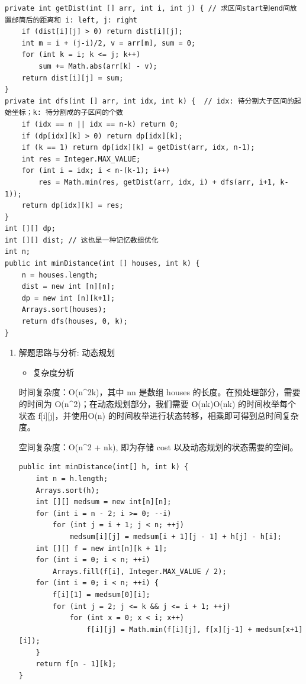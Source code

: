 \documentclass[9pt, b5paaper]{book}
\begin{document}
\begin{verbatim}
private int getDist(int [] arr, int i, int j) { // 求区间start到end间放置邮筒后的距离和 i: left, j: right
    if (dist[i][j] > 0) return dist[i][j];
    int m = i + (j-i)/2, v = arr[m], sum = 0;
    for (int k = i; k <= j; k++) 
        sum += Math.abs(arr[k] - v);
    return dist[i][j] = sum;
}
private int dfs(int [] arr, int idx, int k) {  // idx: 待分割大子区间的起始坐标；k: 待分割成的子区间的个数 
    if (idx == n || idx == n-k) return 0;
    if (dp[idx][k] > 0) return dp[idx][k];
    if (k == 1) return dp[idx][k] = getDist(arr, idx, n-1);
    int res = Integer.MAX_VALUE;
    for (int i = idx; i < n-(k-1); i++) 
        res = Math.min(res, getDist(arr, idx, i) + dfs(arr, i+1, k-1));
    return dp[idx][k] = res;
}
int [][] dp;
int [][] dist; // 这也是一种记忆数组优化
int n;
public int minDistance(int [] houses, int k) {
    n = houses.length;
    dist = new int [n][n];
    dp = new int [n][k+1];
    Arrays.sort(houses);
    return dfs(houses, 0, k);
}
\end{verbatim}
\begin{enumerate}
\item 解题思路与分析: 动态规划
\label{sec-1-4-39-1}
\begin{itemize}
\item 复杂度分析
\end{itemize}

时间复杂度：O(n\^{}2k)，其中 nn 是数组 houses 的长度。在预处理部分，需要的时间为 O(n\^{}2)；在动态规划部分，我们需要 O(nk)O(nk) 的时间枚举每个状态 f[i][j]，并使用O(n) 的时间枚举进行状态转移，相乘即可得到总时间复杂度。

空间复杂度：O(n\^{}2 + nk), 即为存储 cost 以及动态规划的状态需要的空间。

\begin{verbatim}
public int minDistance(int[] h, int k) {
    int n = h.length;
    Arrays.sort(h);
    int [][] medsum = new int[n][n];
    for (int i = n - 2; i >= 0; --i) 
        for (int j = i + 1; j < n; ++j) 
            medsum[i][j] = medsum[i + 1][j - 1] + h[j] - h[i];
    int [][] f = new int[n][k + 1];
    for (int i = 0; i < n; ++i) 
        Arrays.fill(f[i], Integer.MAX_VALUE / 2);
    for (int i = 0; i < n; ++i) {
        f[i][1] = medsum[0][i];
        for (int j = 2; j <= k && j <= i + 1; ++j)
            for (int x = 0; x < i; x++) 
                f[i][j] = Math.min(f[i][j], f[x][j-1] + medsum[x+1][i]);
    }
    return f[n - 1][k];
}
\end{verbatim}
\end{enumerate}
\end{document}
